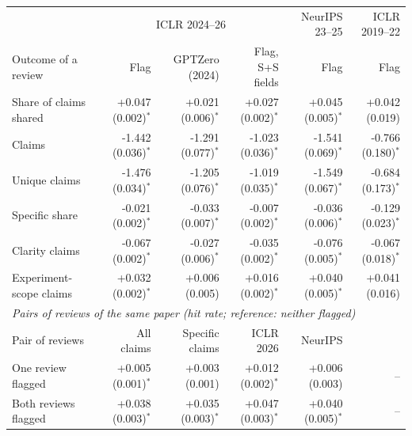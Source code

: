 \begin{tabular}{lrrrrr}
\toprule
& \multicolumn{3}{c}{ICLR 2024--26} & NeurIPS 23--25 & ICLR 2019--22 \\
Outcome of a review & Flag & GPTZero (2024) & Flag, S+S fields & Flag & Flag \\
\midrule
Share of claims shared & +0.047 (0.002)$^{*}$ & +0.021 (0.006)$^{*}$ & +0.027 (0.002)$^{*}$ & +0.045 (0.005)$^{*}$ & +0.042 (0.019) \\
Claims & -1.442 (0.036)$^{*}$ & -1.291 (0.077)$^{*}$ & -1.023 (0.036)$^{*}$ & -1.541 (0.069)$^{*}$ & -0.766 (0.180)$^{*}$ \\
Unique claims & -1.476 (0.034)$^{*}$ & -1.205 (0.076)$^{*}$ & -1.019 (0.035)$^{*}$ & -1.549 (0.067)$^{*}$ & -0.684 (0.173)$^{*}$ \\
Specific share & -0.021 (0.002)$^{*}$ & -0.033 (0.007)$^{*}$ & -0.007 (0.002)$^{*}$ & -0.036 (0.006)$^{*}$ & -0.129 (0.023)$^{*}$ \\
Clarity claims & -0.067 (0.002)$^{*}$ & -0.027 (0.006)$^{*}$ & -0.035 (0.002)$^{*}$ & -0.076 (0.005)$^{*}$ & -0.067 (0.018)$^{*}$ \\
Experiment-scope claims & +0.032 (0.002)$^{*}$ & +0.006 (0.005) & +0.016 (0.002)$^{*}$ & +0.040 (0.005)$^{*}$ & +0.041 (0.016) \\
\midrule
\multicolumn{6}{l}{\emph{Pairs of reviews of the same paper (hit rate; reference: neither flagged)}} \\
Pair of reviews & All claims & Specific claims & ICLR 2026 & NeurIPS & \\
One review flagged & +0.005 (0.001)$^{*}$ & +0.003 (0.001) & +0.012 (0.002)$^{*}$ & +0.006 (0.003) & -- \\
Both reviews flagged & +0.038 (0.003)$^{*}$ & +0.035 (0.003)$^{*}$ & +0.047 (0.003)$^{*}$ & +0.040 (0.005)$^{*}$ & -- \\
\bottomrule
\end{tabular}
